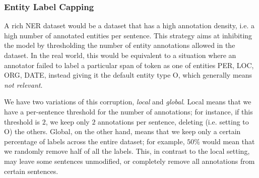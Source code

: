 \documentclass{article}
\begin{document}

\subsubsection{Entity Label Capping}
\label{sec:method:cap}

A rich NER dataset would be a dataset that has a high annotation density, i.e. a high number of annotated entities per sentence.
This strategy aims at inhibiting the model by thresholding the number of entity annotations allowed in the dataset. In the real world, this would be equivalent to a situation where an annotator failed to label a particular span of token as one of entities PER, LOC, ORG, DATE, instead giving it the default entity type O, which generally means \textit{not relevant}.

We have two variations of this corruption, \textit{local} and \textit{global}. Local means that we have a per-sentence threshold for the number of annotations; for instance, if this threshold is $2$, we keep only $2$ annotations per sentence, deleting (i.e. setting to O) the others. Global, on the other hand, means that we keep only a certain percentage of labels across the entire dataset; for example, $50\%$ would mean that we randomly remove half of all the labels. This, in contrast to the local setting, may leave some sentences unmodified, or completely remove all annotations from certain sentences.

\end{document}
